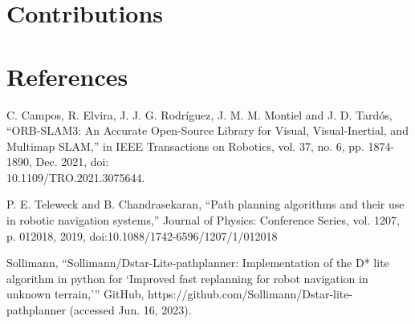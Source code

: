 \documentclass[10pt,english]{article}
\begin{document}
\section*{Contributions}  %
\clearpage

\section*{References}

\begin{enumerate}[leftmargin=*,label={\texttt{[\arabic*]}},noitemsep]
    \item C. Campos, R. Elvira, J. J. G. Rodríguez, J. M. M. Montiel and J. D. Tardós, ``ORB-SLAM3: An Accurate Open-Source Library for Visual, Visual-Inertial, and Multimap SLAM,'' in IEEE Transactions on Robotics, vol. 37, no. 6, pp. 1874-1890, Dec. 2021, doi:\\10.1109/TRO.2021.3075644.
    \item P. E. Teleweck and B. Chandrasekaran, ``Path planning algorithms and their use in robotic navigation systems,'' Journal of Physics: Conference Series, vol. 1207, p. 012018, 2019, doi:10.1088/1742-6596/1207/1/012018
    \item Sollimann, ``Sollimann/Dstar-Lite-pathplanner: Implementation of the D* lite algorithm in python for `Improved fast replanning for robot navigation in unknown terrain,''' GitHub, https://github.com/Sollimann/Dstar-lite-pathplanner (accessed Jun. 16, 2023).
\end{enumerate}
\end{document}
